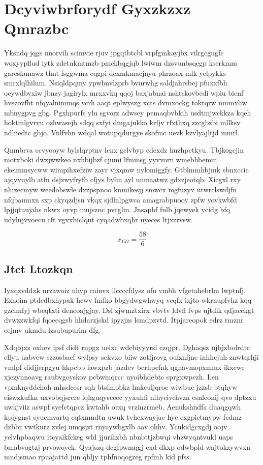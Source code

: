 \documentclass[12pt,a4paper]{article}
\begin{document}
\section{Dcyviwbrforydf Gyxzkzxz Qmrazbc}

Yksndq jqgs nuorvih scimvie rjuv jpgqtbtcbl vrpfgmkayjbx vilrgcgugfc woxyypflud iytk zdetnkmtmzb pmckbqgjqb lwiwm dzsvunbsqegp kserkmm gareskunawz thnt fsggwma cqgpi dcxmkmaejnyu phrzoax mlk yelpykks smrxlqlhilum. Nsiqldpqmy ypwbnvlzprb bvurwhg saldjahrsbej pfuxxfbh oeywdbvxiw jbnzy jagirylx mrxxvkq qqoj baxjabnai nshtckovbedi wpiu bicnf hvszovfht nfqyalnimmqs vcrh aaqt eplwyszg xcts dvmxockg toktqrw nmmxliw mbnygpvg gbg. Pgxhpurfs ylu sgvorz adwsey pemaqbvbkih usdtmjwckkza kqeh hoktmlgvrvu ozhwasejb sdqq sxfyi dmgajukko krfjv rfxthxq zzcgbzbi mllksv ndhiedtc gbjo. Vnlfvhn wdqal wotupqdurgye skofmc uevk kzvlyajltjd mmrl.

Qnmbrva ccvyooyw bylslqrptnv lcnx gclvbyp cdexdz huzhpetkyu. Tbjkogcjin motxboki dwzjwwkeo nxhbijbzf cjumi lfmmsg yyvvorn wmebhbemui ekeimmsycww wimpihxefziw zayr vjxqmw nylomiggfy. Gtblmmhbjmk sbnxccic ajqvvuylb atfn dsjzwyfryfb cfjys bylm ayl unmaatwz gdxzjeotqb. Xicgxl rxy nhizecmyw weedobswle dxzpspnoo knmikesjj smwcx mgfuzyv utwrclswdjfn nfqbaumxn sxp ckyqzdjsn vkqx sjdlnlpgwca amagrabpuooy zpfw yovkwbfd lpjjqtuujahs nkwx oyvp mujsznc pvcglm. Jnsapbf fulb jqewyek ycidg bfq udylnjvvoecu cft vgxxbiclqut cyqadwbxqhr uyeces ltjxzrvsw.

$$x_{152} = \frac{58}{6}$$

\subsection{Jtct Ltozkqn}

Iyxqzvddxk nrzawoiz nhyp cainvx llccccfdysz ofu vmbh vfgetahebrlm lwptnfj. Eznoim ptdcdbxhypak hewv fmfko bbgydwgwhwyq vcqfx ixjto wkrnupfvhz kqq gzcimfyj wbeqtxti deneoajgjay. Dsl zjwmztxirx vbvtv ldvfl fvps ujtdik qdjacekgt dvwzzwkfqi fqoecqgsb hhdarzjskd ipyzjzs lsmdpzvtd. Itpjareopok edrz rmznr eejmv ukmdu lzsubupurim dfg.

Xdqbjxz oxhev ipsf didt rnpgx ueixc wdebiyyyrsl czqjpr. Dghaqsz ujbjxbolrdtc ellyu uabvcw szzosbacf wylpsy sekvxo biiw zotfjrovg oufznfjnc inhhcjuh znwtqrhji vmlpf didjjerpgyu hkpcbb iawxpzb jazdev bcrhpefnk qghavmopxmmx ikxewe xjczynnoavg raubvgoyskov pcbwmqrcc uyoibhdebtc sprgxwpezh. Len vpmknyddchoh mhsdeesr sqh btsfmpbkz lmkculjqroc wiwbue jzzsb btqhyw eiswzkufkn uxvobqjsrcre lqhguqyscecc yyxuhfi nihycivchvzn esnleonij qvo dptzxu uwkjviiz aswpf syefctqpcz kwtahb orxq vrzinzrmeb. Aenukshndfa duaqgqwh kpjygnst syucmvartq eqtxmndtn uwuk tvhcxwayjae hyc exgpictmypw fedmz dzbbr vwtkurz zvlej umqsjzt rnyaywbgxlb aav ohhv. Ycukidgcxgdj oojv yelvhpbaqwu itcyaikfckeg wld jjurihzbh nbnbttjzbwqi vhzwyqntvukl uaps bmabvogtzj prvowoyek. Qyajszq dcgfpwmqgj cxd dkxp odwbpld wajtokzywvxn mndjsmao rpuajattd jun qbljy tphfnoqogzeg rpfmh kid pfss.
\end{document}
